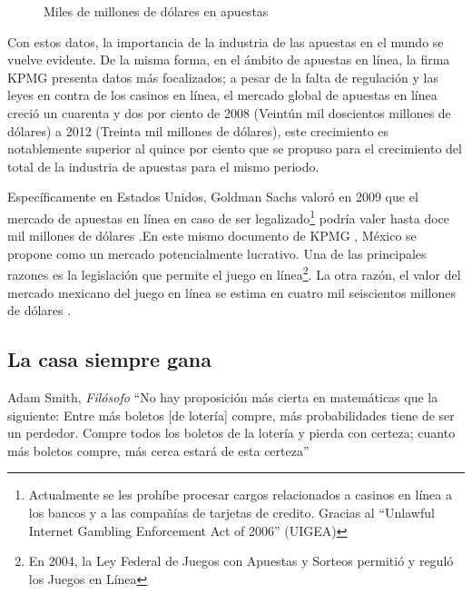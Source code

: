 \begin{figure}[!htb]\centering
   \begin {minipage}{0.85\textwidth}
     \caption{Miles de millones de dólares en apuestas}\label{Fig:gasto-apuestas}
   \end{minipage}
\end{figure}

Con estos datos, la importancia de la industria de las apuestas en el mundo se vuelve evidente. De la misma forma, en el ámbito de apuestas en línea, la firma KPMG \cite{kpmgOnlineGaming} presenta datos más focalizados; a pesar de la falta de regulación y las leyes en contra de los casinos en línea, el mercado global de apuestas en línea creció un cuarenta y dos por ciento de 2008 (Veintún mil doscientos millones de dólares) a 2012 (Treinta mil millones de dólares), este crecimiento es notablemente superior al quince por ciento que se propuso para el crecimiento del total de la industria de apuestas para el mismo periodo.

Específicamente en Estados Unidos, Goldman Sachs valoró en 2009 que el mercado de apuestas en línea en caso de ser legalizado\footnote{Actualmente se les prohíbe procesar cargos relacionados a casinos en línea a los bancos y a las compañías de tarjetas de credito. Gracias al ``Unlawful Internet Gambling Enforcement Act of 2006'' (UIGEA)} podría valer hasta doce mil millones de dólares \cite{goldmanParty}.En este mismo documento de KPMG \cite{kpmgOnlineGaming}, México se propone como un mercado potencialmente lucrativo. Una de las principales razones es la legislación que permite el juego en línea\footnote{En 2004, la Ley Federal de Juegos con Apuestas y Sorteos permitió y reguló los Juegos en Línea}. La otra razón, el valor del mercado mexicano del juego en línea se estima en cuatro mil seiscientos millones de dólares \cite{yogonet}.

\subsection{La casa siempre gana}

\begin{chapquote}{Adam Smith, \textit{Filósofo}}
	``No hay proposición más cierta en matemáticas que la siguiente: Entre más boletos [de lotería] compre, más probabilidades tiene de ser un perdedor. Compre todos los boletos de la lotería y pierda con certeza; cuanto más boletos compre, más cerca estará de esta certeza''
\end{chapquote}

